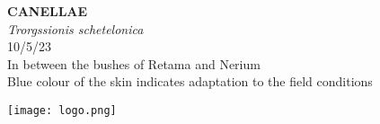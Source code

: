 \documentclass[
  landscape]{article}
\begin{document}
\begin{mdframed}[linecolor=mycolortext, linewidth=2pt, backgroundcolor=mycolor]

  \bigskip
  \begin{flushright}
  \begin{minipage}[t][-50ex][t]{16em}  
  \end{minipage}
  \end{flushright}
  \bigskip
  \begin{adjustwidth}{1cm}{1cm}
  {\fontsize{50pt}{0pt}\selectfont\bf\textcolor{mycolortext}{ CANELLAE }} \\
  \linebreak
  \linebreak
  {\fontsize{40pt}{100pt}\selectfont\textcolor{mycolortext}{\emph{ Trorgssionis schetelonica }}} \\
  \vfill
  {\fontsize{30pt}{100pt}\selectfont\textcolor{mycolortext}{ 10/5/23 }} \\
  \vfill
  {\fontsize{30pt}{100pt}\selectfont\textcolor{mycolortext}{ In between the bushes of Retama and Nerium }} \\
  \vfill
  {\fontsize{30pt}{50pt}\selectfont\textcolor{mycolortext}{ Blue colour of the skin indicates adaptation to the field conditions }} \\
  \end{adjustwidth}
  \begin{center}
  \texttt{[image: logo.png]}
  \end{center}
  \end{mdframed}
  \pagebreak
\end{document}
